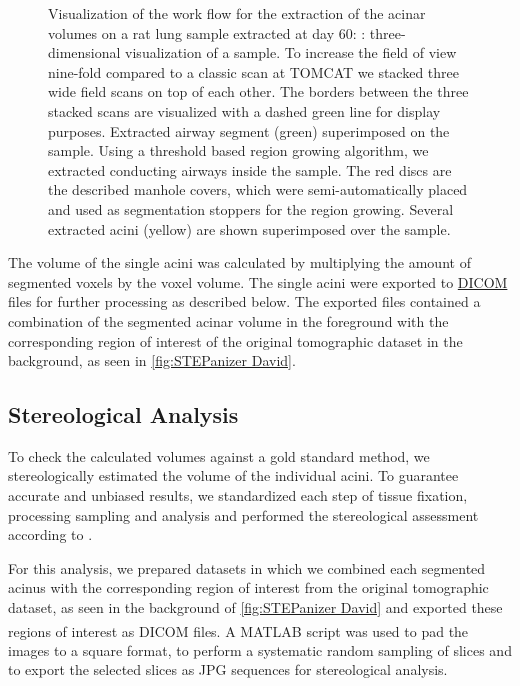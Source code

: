 \documentclass[a4paper,DIVcalc,abstract,english]{scrartcl}
\newlength\imagescale		%
\begin{document}
\begin{figure}[htb]
{\begin{tikzpicture}[x=\imagescale,y=-\imagescale]
		\end{tikzpicture}%
		\label{subfig:extracted acini}%
		}
	\caption{Visualization of the work flow for the extraction of the acinar volumes on a rat lung sample extracted at day 60: %
		\protect{}: three-dimensional visualization of a sample.
		To increase the field of view nine-fold compared to a classic scan at TOMCAT we stacked three wide field scans on top of each other.
		The borders between the three stacked scans are visualized with a dashed green line for display purposes.
		\protect{} Extracted airway segment (green) superimposed on the sample.
		Using a threshold based region growing algorithm, we extracted conducting airways inside the sample.
		The red discs are the described manhole covers, which were semi-automatically placed and used as segmentation stoppers for the region growing.
		\protect{} Several extracted acini (yellow) are shown superimposed over the sample.
	}
	\label{fig:workflow}
\end{figure}

The volume of the single acini was calculated by multiplying the amount of segmented voxels by the voxel volume.
The single acini were exported to \href{https://secure.wikimedia.org/wikipedia/en/w/index.php?title=Digital_Imaging_and_Communications_in_Medicine&oldid=415023605}{DICOM} files for further processing as described below.
The exported files contained a combination of the segmented acinar volume in the foreground with the corresponding region of interest of the original tomographic dataset in the background, as seen in \autoref{fig:STEPanizer David}.

\subsection{Stereological Analysis}
To check the calculated volumes against a gold standard method, we stereologically estimated the volume of the individual acini.
To guarantee accurate and unbiased results, we standardized each step of tissue fixation, processing sampling and analysis and performed the stereological assessment according to \citet{Hsia2010}.

For this analysis, we prepared datasets in which we combined each segmented acinus with the corresponding region of interest from the original tomographic dataset, as seen in the background of \autoref{fig:STEPanizer David} and exported these regions of interest as DICOM files.
A MATLAB\textsuperscript{\textregistered} script was used to pad the images to a square format, to perform a systematic random sampling of slices and to export the selected slices as JPG sequences for stereological analysis.
\end{document}
